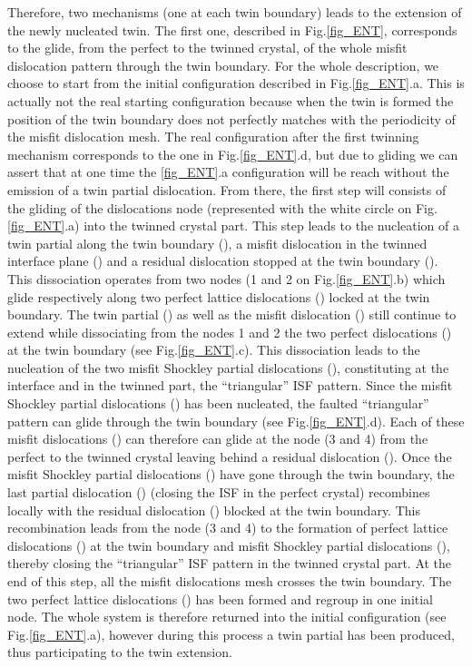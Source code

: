 \documentclass[final,3p,times,twocolumn]{elsarticle}
\begin{document}
Therefore, two mechanisms (one at each twin boundary) leads to the extension of the newly nucleated twin. The first one, described in Fig.\ref{fig_ENT}, corresponds to the glide, from the perfect to the twinned crystal, of the whole misfit dislocation pattern through the twin boundary. For the whole description, we choose to start from the initial configuration described in Fig.\ref{fig_ENT}.a. This is actually not the real starting configuration because when the twin is formed the position of the twin boundary does not perfectly matches with the periodicity of the misfit dislocation mesh. The real configuration after the first twinning mechanism corresponds to the one in Fig.\ref{fig_ENT}.d, but due to gliding we can assert that at one time the \ref{fig_ENT}.a configuration will be reach without the emission of a twin partial dislocation. From there, the first step will consists of the gliding of the dislocations node (represented with the white circle on Fig.\ref{fig_ENT}.a) into the twinned crystal part. This step leads to the nucleation of a twin partial along the twin boundary (), a misfit dislocation in the twinned interface plane () and a residual dislocation stopped at the twin boundary (). This dissociation operates from two nodes (1 and 2 on Fig.\ref{fig_ENT}.b) which glide respectively along two perfect lattice dislocations () locked at the twin boundary. The twin partial () as well as the misfit dislocation () still continue to extend while dissociating from the nodes 1 and 2 the two perfect dislocations () at the twin boundary (see Fig.\ref{fig_ENT}.c). This dissociation leads to the nucleation of the two misfit Shockley partial dislocations (), constituting at the interface and in the twinned part, the ``triangular'' ISF pattern. Since the misfit Shockley partial dislocations () has been nucleated, the faulted ``triangular'' pattern can glide through the twin boundary (see Fig.\ref{fig_ENT}.d). Each of these misfit dislocations () can therefore can glide at the node (3 and 4) from the perfect to the twinned crystal leaving behind a residual dislocation (). Once the misfit Shockley partial dislocations () have gone through the twin boundary, the last partial dislocation () (closing the ISF in the perfect crystal) recombines locally with the residual dislocation () blocked at the twin boundary. This recombination leads from the node (3 and 4) to the formation of perfect lattice dislocations () at the twin boundary and misfit Shockley partial dislocations (), thereby closing the ``triangular'' ISF pattern in the twinned crystal part. At the end of this step, all the misfit dislocations mesh crosses the twin boundary. The two perfect lattice dislocations () has been formed and regroup in one initial node. The whole system is therefore returned into the initial configuration (see Fig.\ref{fig_ENT}.a), however during this process a twin partial has been produced, thus participating to the twin extension. 
\end{document}
